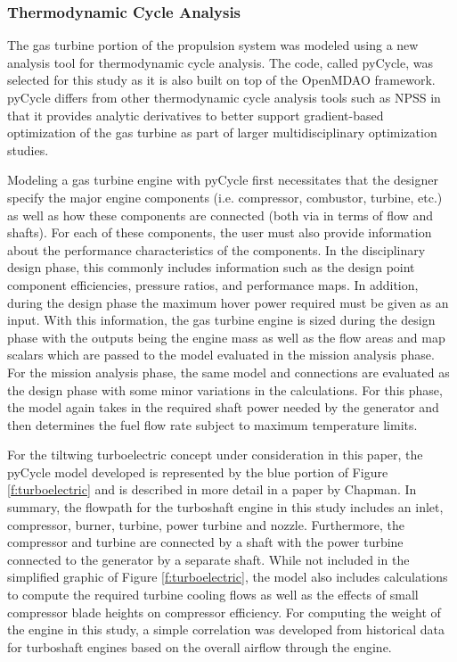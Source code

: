 \subsubsection{Thermodynamic Cycle Analysis} %
The gas turbine portion of the propulsion system was modeled using a new analysis tool for thermodynamic cycle analysis.
The code, called pyCycle\cite{gray2017chemical,hearn2016optimization}, was selected for this study as it is also built on top of the OpenMDAO framework.
pyCycle differs from other thermodynamic cycle analysis tools such as NPSS in that it provides analytic derivatives to better support gradient-based optimization of the gas turbine as part of larger multidisciplinary optimization studies.


Modeling a gas turbine engine with pyCycle first necessitates that the designer specify the major engine components (i.e. compressor, combustor, turbine, etc.) as well as how these components are connected (both via in terms of flow and shafts).
For each of these components, the user must also provide information about the performance characteristics of the components.
In the disciplinary design phase, this commonly includes information such as the design point component efficiencies, pressure ratios, and performance maps.
In addition, during the design phase the maximum hover power required must be given as an input.
With this information, the gas turbine engine is sized during the design phase with the outputs being the engine mass as well as the flow areas and map scalars which are passed to the model evaluated in the mission analysis phase.
For the mission analysis phase, the same model and connections are evaluated as the design phase with some minor variations in the calculations.  
For this phase, the model again takes in the required shaft power needed by the generator and then determines the fuel flow rate subject to maximum temperature limits.

For the tiltwing turboelectric concept under consideration in this paper, the pyCycle model developed is represented by the blue portion of Figure \ref{f:turboelectric} and is described in more detail in a paper by Chapman.\cite{chapman2018multi}
In summary, the flowpath for the turboshaft engine in this study includes an inlet, compressor, burner, turbine, power turbine and nozzle. 
Furthermore, the compressor and turbine are connected by a shaft with the power turbine connected to the generator by a separate shaft. 
While not included in the simplified graphic of Figure \ref{f:turboelectric}, the model also includes calculations to compute the required turbine cooling flows as well as the effects of small compressor blade heights on compressor efficiency.
For computing the weight of the engine in this study, a simple correlation was developed from historical data for turboshaft engines based on the overall airflow through the engine.






